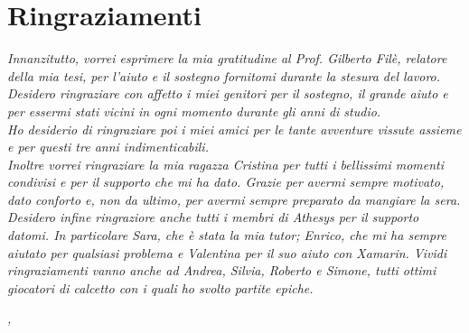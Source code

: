 
\cleardoublepage
{}
{}


\begingroup
\let\clearpage\relax
\let\cleardoublepage\relax
\let\cleardoublepage\relax

\chapter*{Ringraziamenti}

\noindent \textit{Innanzitutto, vorrei esprimere la mia gratitudine al Prof. Gilberto Filè, relatore della mia tesi, per l'aiuto e il sostegno fornitomi durante la stesura del lavoro.}\\

\noindent \textit{Desidero ringraziare con affetto i miei genitori per il sostegno, il grande aiuto e per essermi stati vicini in ogni momento durante gli anni di studio.}\\

\noindent \textit{Ho desiderio di ringraziare poi i miei amici per le tante avventure vissute assieme e per questi tre anni indimenticabili.}\\

\noindent \textit{Inoltre vorrei ringraziare la mia ragazza Cristina per tutti i bellissimi momenti condivisi e per il supporto che mi ha dato. Grazie per avermi sempre motivato, dato conforto e, non da ultimo, per avermi sempre preparato da mangiare la sera.}\\

\noindent \textit{Desidero infine ringraziore anche tutti i membri di \emph{Athesys} per il supporto datomi. In particolare Sara, che è stata la mia tutor; Enrico, che mi ha sempre aiutato per qualsiasi problema e Valentina per il suo aiuto con Xamarin. Vividi ringraziamenti vanno anche ad Andrea, Silvia, Roberto e Simone, tutti ottimi giocatori di calcetto con i quali ho svolto partite epiche.}
\bigskip

\noindent\textit{\myLocation, \myTime}
\hfill \myName

\endgroup

